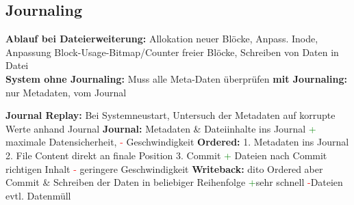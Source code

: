 \subsection{Journaling}
\textbf{Ablauf bei Dateierweiterung:} Allokation neuer Blöcke, Anpass. Inode, Anpassung Block-Usage-Bitmap/Counter freier Blöcke, Schreiben von Daten in Datei\\
\textbf{System ohne Journaling:} Muss alle Meta-Daten überprüfen
\textbf{mit Journaling:} nur Metadaten, vom Journal

\textbf{Journal Replay:} Bei Systemneustart, Untersuch der Metadaten auf korrupte Werte anhand Journal
\textbf{Journal: }Metadaten \& Dateiinhalte ins Journal \textcolor{green}{+} maximale Datensicherheit, \textcolor{red}{-} Geschwindigkeit
\textbf{Ordered: }1. Metadaten ins Journal 2. File Content direkt an finale Position 3. Commit \textcolor{green}{+} Dateien nach Commit richtigen Inhalt \textcolor{red}{-} geringere Geschwindigkeit
\textbf{Writeback: }dito Ordered aber Commit \& Schreiben der Daten in beliebiger Reihenfolge \textcolor{green}{+}sehr schnell \textcolor{red}{-}Dateien evtl. Datenmüll
